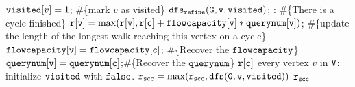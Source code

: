 \begin{algorithm}
\begin{algorithmic}[1]
            \STATE \qquad \qquad \qquad  $\mathtt{visited}[v] = 1$; \#\{mark $v$ as visited\}
            \STATE \qquad \qquad \qquad $\mathtt{dfs_{refine}(G, v, visited)}$;
            \STATE \qquad {}: \#\{There is a cycle finished\}
            \STATE \qquad \qquad \qquad 
             $\mathtt{r[v] =  \max(r[v], r[c] + flowcapacity[v] * querynum[v])}$; \#\{update the length of the longest walk reaching this vertex on a cycle\}
            \STATE \qquad \qquad \qquad $\mathtt{flowcapacity[v] = flowcapacity[c]}$; \#\{Recover the $\mathtt{flowcapacity}$\}
            \STATE \qquad \qquad \qquad $\mathtt{querynum[v] = querynum[c]}$;\#\{Recover the $\mathtt{querynum}$\}
            \STATE {}  $\mathtt{r[c]}$
             every vertex $v$ in $\mathtt{V}$:
            \STATE  \qquad initialize $\mathtt{visited}$ with $\mathtt{false}$.
            \STATE  \qquad $\mathtt{r_{scc} = \max(r_{scc}, dfs(G, v, \mathtt{visited} ))}$  
            \RETURN  $\mathtt{r_{scc}}$
            \end{algorithmic}
            \end{algorithm}

